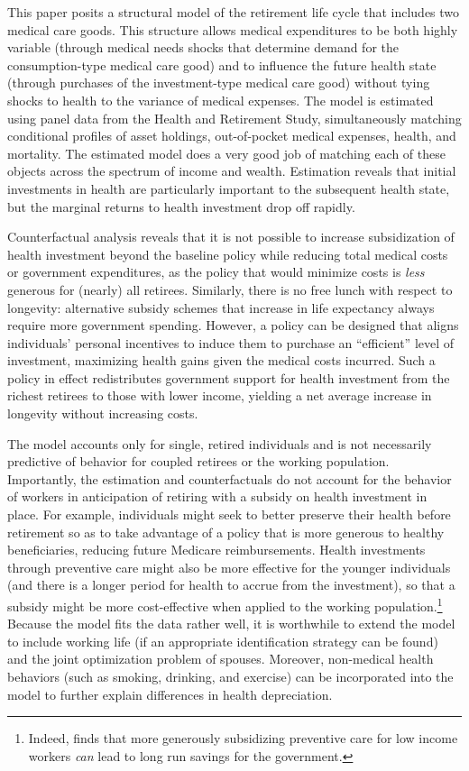\documentclass[12pt,pdftex,letterpaper]{article}
\begin{document}
This paper posits a structural model of the retirement life cycle that includes two medical care goods.  This structure allows medical expenditures to be both highly variable (through medical needs shocks that determine demand for the consumption-type medical care good) and to influence the future health state (through purchases of the investment-type medical care good) without tying shocks to health to the variance of medical expenses.  The model is estimated using panel data from the Health and Retirement Study, simultaneously matching conditional profiles of asset holdings, out-of-pocket medical expenses, health, and mortality.  The estimated model does a very good job of matching each of these objects across the spectrum of income and wealth.  Estimation reveals that initial investments in health are particularly important to the subsequent health state, but the marginal returns to health investment drop off rapidly.

Counterfactual analysis reveals that it is not possible to increase subsidization of health investment beyond the baseline policy while reducing total medical costs or government expenditures, as the policy that would minimize costs is \textit{less} generous for (nearly) all retirees.  Similarly, there is no free lunch with respect to longevity: alternative subsidy schemes that increase in life expectancy always require more government spending.  However, a policy can be designed that aligns individuals' personal incentives to induce them to purchase an ``efficient'' level of investment, maximizing health gains given the medical costs incurred.  Such a policy in effect redistributes government support for health investment from the richest retirees to those with lower income, yielding a net average increase in longevity without increasing costs.

The model accounts only for single, retired individuals and is not necessarily predictive of behavior for coupled retirees or the working population.  Importantly, the estimation and counterfactuals do not account for the behavior of workers in anticipation of retiring with a subsidy on health investment in place.  For example, individuals might seek to better preserve their health before retirement so as to take advantage of a policy that is more generous to healthy beneficiaries, reducing future Medicare reimbursements.  Health investments through preventive care might also be more effective for the younger individuals (and there is a longer period for health to accrue from the investment), so that a subsidy might be more cost-effective when applied to the working population.\footnote{Indeed, \cite{ozkan14} finds that more generously subsidizing preventive care for low income workers \textit{can} lead to long run savings for the government.}  Because the model fits the data rather well, it is worthwhile to extend the model to include working life (if an appropriate identification strategy can be found) and the joint optimization problem of spouses.  Moreover, non-medical health behaviors (such as smoking, drinking, and exercise) can be incorporated into the model to further explain differences in health depreciation.
\end{document}
